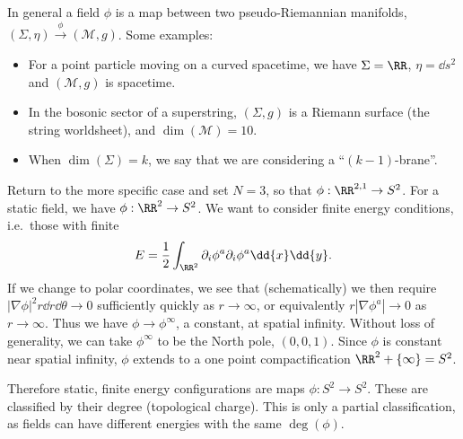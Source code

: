 \documentclass{jknotes}
\begin{document}
In general a field \(\phi\) is a map between two pseudo-Riemannian manifolds, \((\Sigma,\eta)\stackrel{\phi}{\to}(\mathcal{M},g)\). Some examples:
\begin{itemize}
    \item For a point particle moving on a curved spacetime, we have \(\Sigma = \RR\), \(\eta=\dd{s}^2\) and \((\mathcal{M},g)\) is spacetime.
    \item In the bosonic sector of a superstring, \((\Sigma,g)\) is a Riemann surface (the string worldsheet), and \(\dim(\mathcal{M})=10\).
    \item When \(\dim(\Sigma) = k\), we say that we are considering a ``\((k-1)\)-brane''.
\end{itemize}

Return to the more specific case and set \(N=3\), so that \(\phi:\RR^{2,1}\to S^2\). For a static field, we have \(\phi:\RR^2\to S^2\). We want to consider finite energy conditions, i.e.\ those with finite
\begin{equation}
    E = \frac{1}{2}\int_{\RR^2}\partial_i\phi^a\partial_i\phi^a\dd{x}\dd{y}.
\end{equation}
If we change to polar coordinates, we see that (schematically) we then require \(|\nabla\phi|^2r\dd{r}\dd{\theta}\to0\) sufficiently quickly as \(r\to\infty\), or equivalently \(r|\nabla\phi^a|\to0\) as \(r\to\infty\). Thus we have \(\phi\to\phi^\infty\), a constant, at spatial infinity. Without loss of generality, we can take \(\phi^\infty\) to be the North pole, \((0,0,1)\). Since \(\phi\) is constant near spatial infinity, \(\phi\) extends to a one point compactification \(\RR^2+\{\infty\}=S^2\). 

Therefore static, finite energy configurations are maps \(\phi:S^2\to S^2\). These are classified by their degree (topological charge). This is only a partial classification, as fields can have different energies with the same \(\deg(\phi)\).
\end{document}
